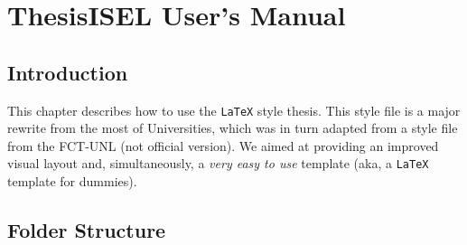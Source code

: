 % 
%  
%
\chapter{ThesisISEL User's Manual}
\label{cha:users_manual}



\section{Introduction} %
\label{sec:introduction}

This chapter describes how to use the  \texttt{LaTeX} style thesis{}. This style file is a major rewrite from the most of Universities, which was in turn adapted from a style file from the FCT-UNL (not official version). We aimed at providing an improved visual layout and, simultaneously, a \emph{very easy to use} template (aka, a  \texttt{LaTeX} template for dummies).

\noindent%



\section{Folder Structure} %
\label{sec:folder_structure}

